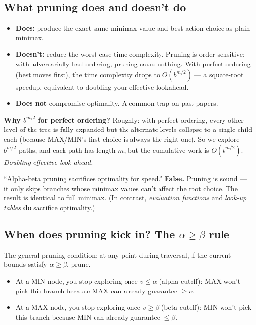 \documentclass[11pt, a4paper]{article}
\begin{document}
\subsection{What pruning does and doesn't do}

\begin{itemize}
  \item \textbf{Does:} produce the exact same minimax value and best-action choice as plain minimax.
  \item \textbf{Doesn't:} reduce the worst-case time complexity. Pruning is order-sensitive; with adversarially-bad ordering, pruning saves nothing. With perfect ordering (best moves first), the time complexity drops to $O(b^{m/2})$ — a square-root speedup, equivalent to doubling your effective lookahead.
  \item \textbf{Does not} compromise optimality. A common trap on past papers.
\end{itemize}

\textbf{Why $b^{m/2}$ for perfect ordering?} Roughly: with perfect ordering, every other level of the tree is fully expanded but the alternate levels collapse to a single child each (because MAX/MIN's first choice is always the right one). So we explore $b^{m/2}$ paths, and each path has length $m$, but the cumulative work is $O(b^{m/2})$. \emph{Doubling effective look-ahead.}

\begin{trapbox}
``Alpha-beta pruning sacrifices optimality for speed.'' \textbf{False.} Pruning is sound — it only skips branches whose minimax values can't affect the root choice. The result is identical to full minimax. (In contrast, \emph{evaluation functions} and \emph{look-up tables} \textbf{do} sacrifice optimality.)
\end{trapbox}

\subsection{\texorpdfstring{When does pruning kick in? The $\alpha \ge \beta$ rule}{When does pruning kick in? The alpha-ge-beta rule}}

The general pruning condition: at any point during traversal, if the current bounds satisfy $\alpha \ge \beta$, prune.

\begin{itemize}
  \item At a MIN node, you stop exploring once $v \le \alpha$ (alpha cutoff): MAX won't pick this branch because MAX can already guarantee $\ge \alpha$.
  \item At a MAX node, you stop exploring once $v \ge \beta$ (beta cutoff): MIN won't pick this branch because MIN can already guarantee $\le \beta$.
\end{itemize}
\end{document}
